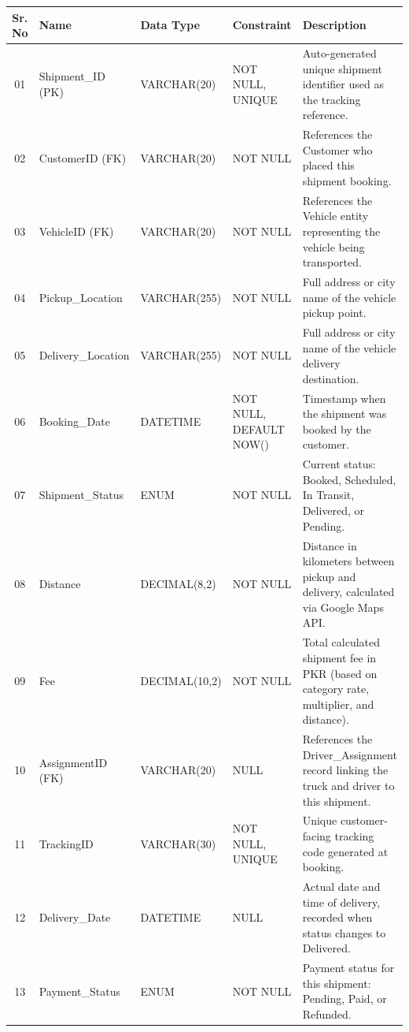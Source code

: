 \documentclass[12pt,a4paper]{report}
\begin{document}
\begin{longtable}{|c|p{3.8cm}|p{2.5cm}|p{3.5cm}|p{5.5cm}|}
\hline
\textbf{Sr. No} & \textbf{Name} & \textbf{Data Type} & \textbf{Constraint} & \textbf{Description} \\
\hline
01 & Shipment\_ID (PK) & VARCHAR(20) & NOT NULL, UNIQUE & Auto-generated unique shipment identifier used as the tracking reference. \\
\hline
02 & CustomerID (FK) & VARCHAR(20) & NOT NULL & References the Customer who placed this shipment booking. \\
\hline
03 & VehicleID (FK) & VARCHAR(20) & NOT NULL & References the Vehicle entity representing the vehicle being transported. \\
\hline
04 & Pickup\_Location & VARCHAR(255) & NOT NULL & Full address or city name of the vehicle pickup point. \\
\hline
05 & Delivery\_Location & VARCHAR(255) & NOT NULL & Full address or city name of the vehicle delivery destination. \\
\hline
06 & Booking\_Date & DATETIME & NOT NULL, DEFAULT NOW() & Timestamp when the shipment was booked by the customer. \\
\hline
07 & Shipment\_Status & ENUM & NOT NULL & Current status: Booked, Scheduled, In Transit, Delivered, or Pending. \\
\hline
08 & Distance & DECIMAL(8,2) & NOT NULL & Distance in kilometers between pickup and delivery, calculated via Google Maps API. \\
\hline
09 & Fee & DECIMAL(10,2) & NOT NULL & Total calculated shipment fee in PKR (based on category rate, multiplier, and distance). \\
\hline
10 & AssignmentID (FK) & VARCHAR(20) & NULL & References the Driver\_Assignment record linking the truck and driver to this shipment. \\
\hline
11 & TrackingID & VARCHAR(30) & NOT NULL, UNIQUE & Unique customer-facing tracking code generated at booking. \\
\hline
12 & Delivery\_Date & DATETIME & NULL & Actual date and time of delivery, recorded when status changes to Delivered. \\
\hline
13 & Payment\_Status & ENUM & NOT NULL & Payment status for this shipment: Pending, Paid, or Refunded. \\
\hline
\end{longtable}

\end{document}

